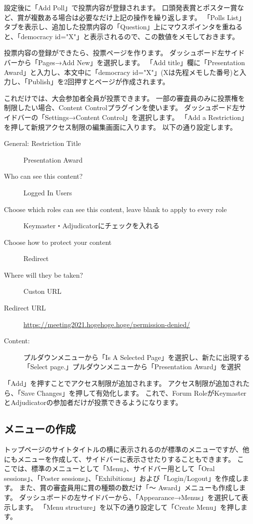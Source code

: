 \documentclass[titlepage,10pt,a4paper,uplatex]{jsbook}
\begin{document}
設定後に「Add Poll」で投票内容が登録されます。
口頭発表賞とポスター賞など、賞が複数ある場合は必要なだけ上記の操作を繰り返します。
「Polls List」タブを表示し、追加した投票内容の「Question」上にマウスポインタを重ねると、「{\lbrack}democracy id="X"{\rbrack}」と表示されるので、この数値をメモしておきます。

投票内容の登録ができたら、投票ページを作ります。
ダッシュボード左サイドバーから「Pages→Add New」を選択します。
「Add title」欄に「Presentation Award」と入力し、本文中に「{\lbrack}democracy id="X"{\rbrack}」(Xは先程メモした番号)と入力し、「Publish」を2回押すとページが作成されます。

これだけでは、大会参加者全員が投票できます。
一部の審査員のみに投票権を制限したい場合、Content Controlプラグインを使います。
ダッシュボード左サイドバーの「Settings→Content Control」を選択します。
「Add a Restriction」を押して新規アクセス制限の編集画面に入ります。
以下の通り設定します。

\begin{description}
\item[General: Restriction Title] Presentation Award
\item[Who can see this content?] Logged In Users
\item[Choose which roles can see this content, leave blank to apply to every role] Keymaster・Adjudicatorにチェックを入れる
\item[Choose how to protect your content] Redirect
\item[Where will they be taken?] Custon URL
\item[Redirect URL] \url{https://meeting2021.hogehoge.hoge/permission-denied/}
\item[Content: ] プルダウンメニューから「Is A Selected Page」を選択し、新たに出現する「Select page.」プルダウンメニューから「Presentation Award」を選択
\end{description}

「Add」を押すことでアクセス制限が追加されます。
アクセス制限が追加されたら、「Save Changes」を押して有効化します。
これで、Forum RoleがKeymasterとAdjudicatorの参加者だけが投票できるようになります。

\subsection{メニューの作成}

トップページのサイトタイトルの横に表示されるのが標準のメニューですが、他にもメニューを作成して、サイドバーに表示させたりすることもできます。
ここでは、標準のメニューとして「Menu」、サイドバー用として「Oral sessions」、「Poster sessions」、「Exhibitions」および「Login/Logout」を作成します。
また、賞の審査員用に賞の種類の数だけ「～ Award」メニューも作成します。
ダッシュボードの左サイドバーから、「Appearance→Menus」を選択して表示します。
「Menu structure」を以下の通り設定して「Create Menu」を押します。
\end{document}
